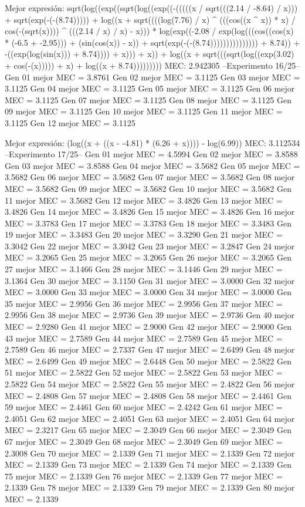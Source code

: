 Mejor expresión: sqrt(log((exp((sqrt(log((exp((-(((((x / sqrt(((2.14 / -8.64) / x))) + sqrt(exp(-(-(8.74))))) + log((x + sqrt((((log(7.76) / x) ^ (((cos((x ^ x)) * x) / cos(-(sqrt(x)))) ^ (((2.14 / x) / x) - x))) * log(exp((-2.08 / exp(log(((cos((cos(x) * (-6.5 + -2.95))) + (sin(cos(x)) - x)) + sqrt(exp(-(-(8.74))))))))))))))) + 8.74)) + -((exp(log(sin(x))) + 8.74)))) + x))) + x)) + log((x + sqrt(((sqrt(log((exp(3.02) + cos(-(x))))) + x) + log((x + 8.74)))))))))
MEC: 2.942305
--Experimento 
 16/25--
Gen 01 mejor MEC = 3.8761
Gen 02 mejor MEC = 3.1125
Gen 03 mejor MEC = 3.1125
Gen 04 mejor MEC = 3.1125
Gen 05 mejor MEC = 3.1125
Gen 06 mejor MEC = 3.1125
Gen 07 mejor MEC = 3.1125
Gen 08 mejor MEC = 3.1125
Gen 09 mejor MEC = 3.1125
Gen 10 mejor MEC = 3.1125
Gen 11 mejor MEC = 3.1125
Gen 12 mejor MEC = 3.1125

Mejor expresión: (log((x + ((x - -4.81) * (6.26 + x)))) - log(6.99))
MEC: 3.112534
--Experimento 
 17/25--
Gen 01 mejor MEC = 4.5994
Gen 02 mejor MEC = 3.8588
Gen 03 mejor MEC = 3.8588
Gen 04 mejor MEC = 3.5682
Gen 05 mejor MEC = 3.5682
Gen 06 mejor MEC = 3.5682
Gen 07 mejor MEC = 3.5682
Gen 08 mejor MEC = 3.5682
Gen 09 mejor MEC = 3.5682
Gen 10 mejor MEC = 3.5682
Gen 11 mejor MEC = 3.5682
Gen 12 mejor MEC = 3.4826
Gen 13 mejor MEC = 3.4826
Gen 14 mejor MEC = 3.4826
Gen 15 mejor MEC = 3.4826
Gen 16 mejor MEC = 3.3783
Gen 17 mejor MEC = 3.3783
Gen 18 mejor MEC = 3.3483
Gen 19 mejor MEC = 3.3483
Gen 20 mejor MEC = 3.3290
Gen 21 mejor MEC = 3.3042
Gen 22 mejor MEC = 3.3042
Gen 23 mejor MEC = 3.2847
Gen 24 mejor MEC = 3.2065
Gen 25 mejor MEC = 3.2065
Gen 26 mejor MEC = 3.2065
Gen 27 mejor MEC = 3.1466
Gen 28 mejor MEC = 3.1446
Gen 29 mejor MEC = 3.1364
Gen 30 mejor MEC = 3.1150
Gen 31 mejor MEC = 3.0000
Gen 32 mejor MEC = 3.0000
Gen 33 mejor MEC = 3.0000
Gen 34 mejor MEC = 3.0000
Gen 35 mejor MEC = 2.9956
Gen 36 mejor MEC = 2.9956
Gen 37 mejor MEC = 2.9956
Gen 38 mejor MEC = 2.9736
Gen 39 mejor MEC = 2.9736
Gen 40 mejor MEC = 2.9280
Gen 41 mejor MEC = 2.9000
Gen 42 mejor MEC = 2.9000
Gen 43 mejor MEC = 2.7589
Gen 44 mejor MEC = 2.7589
Gen 45 mejor MEC = 2.7589
Gen 46 mejor MEC = 2.7337
Gen 47 mejor MEC = 2.6499
Gen 48 mejor MEC = 2.6499
Gen 49 mejor MEC = 2.6448
Gen 50 mejor MEC = 2.5822
Gen 51 mejor MEC = 2.5822
Gen 52 mejor MEC = 2.5822
Gen 53 mejor MEC = 2.5822
Gen 54 mejor MEC = 2.5822
Gen 55 mejor MEC = 2.4822
Gen 56 mejor MEC = 2.4808
Gen 57 mejor MEC = 2.4808
Gen 58 mejor MEC = 2.4461
Gen 59 mejor MEC = 2.4461
Gen 60 mejor MEC = 2.4242
Gen 61 mejor MEC = 2.4051
Gen 62 mejor MEC = 2.4051
Gen 63 mejor MEC = 2.4051
Gen 64 mejor MEC = 2.3217
Gen 65 mejor MEC = 2.3049
Gen 66 mejor MEC = 2.3049
Gen 67 mejor MEC = 2.3049
Gen 68 mejor MEC = 2.3049
Gen 69 mejor MEC = 2.3008
Gen 70 mejor MEC = 2.1339
Gen 71 mejor MEC = 2.1339
Gen 72 mejor MEC = 2.1339
Gen 73 mejor MEC = 2.1339
Gen 74 mejor MEC = 2.1339
Gen 75 mejor MEC = 2.1339
Gen 76 mejor MEC = 2.1339
Gen 77 mejor MEC = 2.1339
Gen 78 mejor MEC = 2.1339
Gen 79 mejor MEC = 2.1339
Gen 80 mejor MEC = 2.1339

